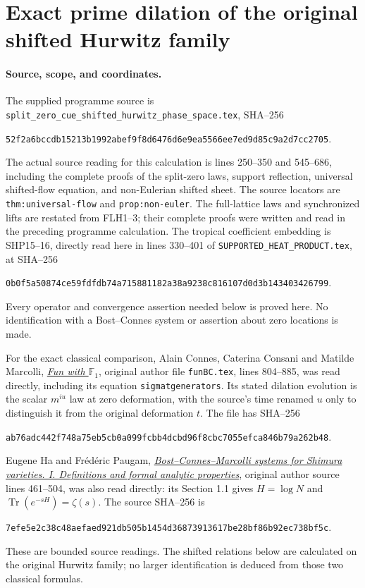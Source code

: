 \section{Exact prime dilation of the original shifted Hurwitz family}
\label{sec:HPS}

\paragraph{Source, scope, and coordinates.}
The supplied programme source is
\texttt{split\_zero\_cue\_shifted\_hurwitz\_phase\_space.tex},
SHA--256
\begin{center}\small
\texttt{52f2a6bccdb15213b1992abef9f8d6476d6e9ea5566ee7ed9d85c9a2d7cc2705}.
\end{center}
The actual source reading for this calculation is lines
250--350 and 545--686, including the complete proofs of the
split-zero laws, support reflection, universal shifted-flow
equation, and non-Eulerian shifted sheet. The source locators
are \texttt{thm:universal-flow} and \texttt{prop:non-euler}.
The full-lattice laws and synchronized lifts are restated
from FLH1--3; their complete proofs were written and read
in the preceding programme calculation. The tropical
coefficient embedding is SHP15--16, directly read here
in lines 330--401 of \texttt{SUPPORTED\_HEAT\_PRODUCT.tex},
at SHA--256
\begin{center}\small
\texttt{0b0f5a50874ce59fdfdb74a715881182a38a9238c816107d0d3b143403426799}.
\end{center}
Every operator and convergence assertion needed below is
proved here. No identification with a Bost--Connes system
or assertion about zero locations is made.

For the exact classical comparison, Alain Connes,
Caterina Consani and Matilde Marcolli,
\href{https://arxiv.org/abs/0806.2401v1}
{\emph{Fun with $\mathbb F_1$}}, original author file
\texttt{funBC.tex}, lines 804--885, was read directly,
including its equation \texttt{sigmatgenerators}.
Its stated dilation evolution is the scalar
$m^{iu}$ law at zero deformation, with the
source's time renamed $u$ only to distinguish
it from the original deformation $t$.
The file has SHA--256
\begin{center}\small
\texttt{ab76adc442f748a75eb5cb0a099fcbb4dcbd96f8cbc7055efca846b79a262b48}.
\end{center}
Eugene Ha and Fr\'ed\'eric Paugam,
\href{https://arxiv.org/abs/math/0507101v1}
{\emph{Bost--Connes--Marcolli systems for Shimura
varieties. I. Definitions and formal analytic properties}},
original author source lines 461--504, was also
read directly: its Section 1.1 gives $H=\log N$
and $\operatorname{Tr}(e^{-sH})=\zeta(s)$.
The source SHA--256 is
\begin{center}\small
\texttt{7efe5e2c38c48aefaed921db505b1454d36873913617be28bf86b92ec738bf5c}.
\end{center}
These are bounded source readings. The shifted
relations below are calculated on the original
Hurwitz family; no larger identification is
deduced from those two classical formulas.

